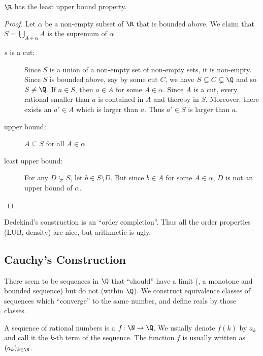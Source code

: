 \begin{theorem}
    $\R$ has the least upper bound property.
\end{theorem}
\begin{proof}
    Let $\alpha$ be a non-empty subset of $\R$ that is bounded above.
    We claim that $S = \bigcup_{A \in \alpha} A$ is the supremum of $\alpha$.
    \begin{description}
        \item[$s$ is a cut:] Since $S$ is a union of a non-empty set of
        non-empty sets, it is non-empty.
        Since $S$ is bounded above, say by some cut $C$, we have
        $S \subseteq C \subsetneq \Q$ and so $S \ne \Q$.
        If $a \in S$, then $a \in A$ for some
        $A \in \alpha$. Since $A$ is a cut, every rational smaller than $a$
        is contained in $A$ and thereby in $S$.
        Moreover, there exists an $a' \in A$ which is larger than $a$.
        Thus $a' \in S$ is larger than $a$.
        \item[upper bound:] $A \subseteq S$ for all $A \in \alpha$.
        \item[least upper bound:] For any $D \subsetneq S$,
        let $b \in S \setminus D$.
        But since $b \in A$ for some $A \in \alpha$, $D$ is not an upper
        bound of $\alpha$. \qedhere
    \end{description}
\end{proof}
Dedekind's construction is an ``order completion''.
Thus all the order properties (LUB, density) are nice, but arithmetic is
ugly.

\subsection{Cauchy's Construction} \label{sec:cauchy}
There seem to be sequences in $\Q$ that ``should'' have a limit (\eg, a
monotone and bounded sequence) but do not (within $\Q$).
We construct equivalence classes of sequences which ``converge'' to the same
number, and define reals by those classes.
\begin{definition}[Sequence]
    A sequence of rational numbers is a $f \colon \N \to \Q$.
    We usually denote $f(k)$ by $a_k$ and call it the $k$-th term of the
    sequence.
    The function $f$ is usually written as $(a_k)_{k \in \N}$.
\end{definition}

